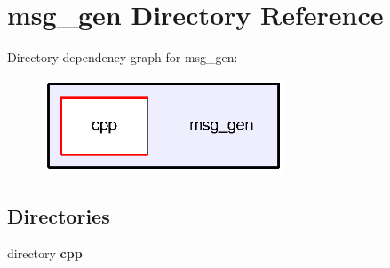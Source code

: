\section{msg\-\_\-gen Directory Reference}
\label{dir_b267ad68c09e05aa6d181ecb02325ef8}
Directory dependency graph for msg\-\_\-gen\-:\nopagebreak
\begin{figure}[H]
\begin{center}
\leavevmode
\includegraphics[width=204pt]{dir_b267ad68c09e05aa6d181ecb02325ef8_dep}
\end{center}
\end{figure}
\subsection*{Directories}
\begin{DoxyCompactItemize}
\item 
directory {\bf cpp}
\end{DoxyCompactItemize}
